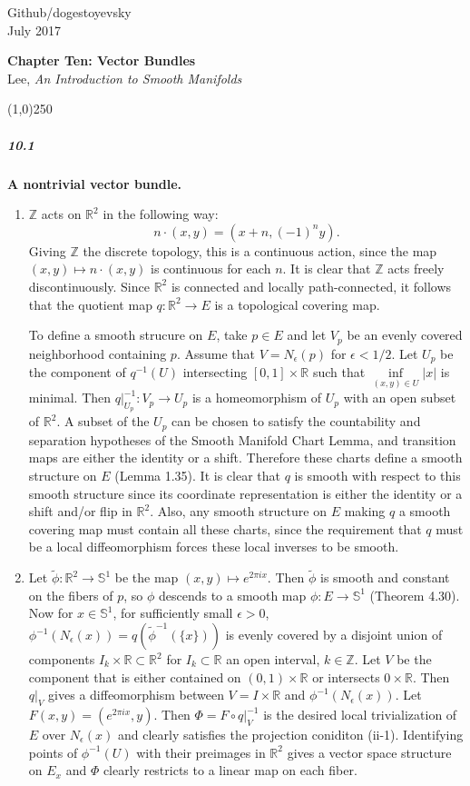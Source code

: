 \documentclass[10pt,letter]{article}
\begin{document}
\noindent Github/dogestoyevsky \\
July 2017
\begin{center}
\textbf{Chapter Ten: Vector Bundles}\\ Lee, \textit{An Introduction to Smooth Manifolds}

\line(1,0){250}
\end{center}

\subparagraph{10.1} {\bf A nontrivial vector bundle.} 
\begin{enumerate}[label=(\alph*)]
\item $\mathbb{Z}$ acts on $\mathbb{R}^2$ in the following way:
\[ n \cdot (x,y) = (x+n,(-1)^ny). \] 
Giving $\mathbb{Z}$ the discrete topology, this is a continuous action, since the map $(x,y) \mapsto n \cdot (x,y)$ is continuous for each $n$. It is clear that $\mathbb{Z}$ acts freely discontinuously. Since $\mathbb{R}^2$ is connected and locally path-connected, it follows that the quotient map $q: \mathbb{R}^2 \rightarrow E$ is a topological covering map. 

To define a smooth strucure on $E$, take $p \in E$ and let $V_p$ be an evenly covered neighborhood containing $p$. Assume that $V = N_{\epsilon}(p)$ for $\epsilon < 1/2$. Let $U_p$ be the component of $q^{-1}(U)$ intersecting $[0,1] \times \mathbb{R}$ such that $\inf \limits_{(x,y) \in U} \vert x \vert$ is minimal. Then $q\vert_{U_p}^{-1}: V_p \rightarrow U_p$ is a homeomorphism of $U_p$ with an open subset of $\mathbb{R}^2$. A subset of the $U_p$ can be chosen to satisfy the countability and separation hypotheses of the Smooth Manifold Chart Lemma, and transition maps are either the identity or a shift. Therefore these charts define a smooth structure on $E$ (Lemma 1.35). It is clear that $q$ is smooth with respect to this smooth structure since its coordinate representation is either the identity or a shift and/or flip in $\mathbb{R}^2$. Also, any smooth structure on $E$ making $q$ a smooth covering map must contain all these charts, since the requirement that $q$ must be a local diffeomorphism forces these local inverses to be smooth.
\item Let $\tilde{\phi}: \mathbb{R}^2 \rightarrow \mathbb{S}^1$ be the map $(x,y) \mapsto e^{2\pi i x}$. Then $\tilde{\phi}$ is smooth and constant on the fibers of $p$, so $\phi$ descends to a smooth map $\phi: E \rightarrow \mathbb{S}^1$ (Theorem 4.30). Now for $x \in \mathbb{S}^1$, for sufficiently small $\epsilon > 0$,   $\phi^{-1}(N_{\epsilon}(x)) = q(\tilde{\phi}^{-1}(\lbrace x \rbrace))$ is evenly covered by a disjoint union of components $I_k \times \mathbb{R} \subset \mathbb{R}^2$ for $I_k \subset \mathbb{R}$ an open interval, $k \in \mathbb{Z}$. Let $V$ be the component that is either contained on $(0,1) \times \mathbb{R}$ or intersects $0 \times \mathbb{R}$. Then $q\vert_V$ gives a diffeomorphism between $V = I \times \mathbb{R}$ and $\phi^{-1}(N_{\epsilon}(x))$. Let $F(x,y) = (e^{2 \pi i x},y)$. Then $\Phi = F \circ q \vert_V^{-1}$ is the desired local trivialization of $E$ over $ N_{\epsilon}(x)$ and clearly satisfies the projection coniditon (ii-1). Identifying points of $\phi^{-1}(U)$ with their preimages in $\mathbb{R}^2$ gives a vector space structure on $E_x$ and $\Phi$ clearly restricts to a linear map on each fiber. 


\end{enumerate}
\end{document}
